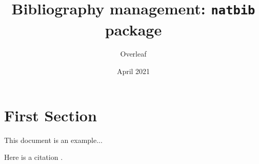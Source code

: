 \documentclass{article}
\title{Bibliography management: \texttt{natbib} package}
\author{Overleaf}
\date{April 2021}
\begin{document}
	
	\maketitle
	
	\tableofcontents
	
	\section{First Section}
	
	This document is an example...
	
	Here is a citation \citep{somekey}.
	
	
	
\end{document}
